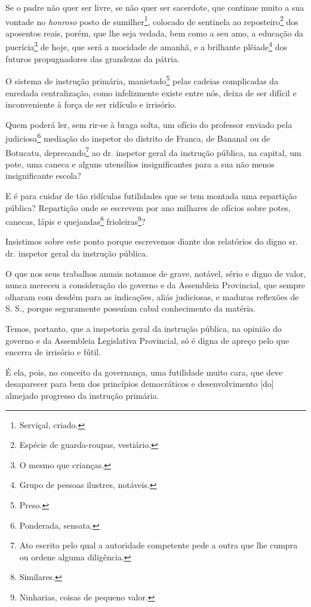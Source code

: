 Se o padre não quer ser livre, se não quer ser sacerdote, que continue
muito a sua vontade no \emph{honroso} posto de sumilher\footnote{
  Serviçal, criado.}, colocado de sentinela ao reposteiro\footnote{
  Espécie de guarda-roupas, vestiário.} dos aposentos reais, porém, que
lhe seja vedada, bem como a seu amo, a educação da puerícia\footnote{O
  mesmo que crianças.} de hoje, que será a mocidade de amanhã, e a
brilhante plêiade\footnote{Grupo de pessoas ilustres, notáveis.} dos
futuros propugnadores das grandezas da pátria.

O sistema de instrução primária, manietado\footnote{Preso.} pelas
cadeias complicadas da enredada centralização, como infelizmente existe
entre nós, deixa de ser difícil e inconveniente à força de ser ridículo
e irrisório.

Quem poderá ler, sem rir-se à braga solta, um ofício do professor
enviado pela judiciosa\footnote{Ponderada, sensata.} mediação do
inspetor do distrito de Franca, de Bananal ou de Botucatu,
deprecando\footnote{Ato escrito pelo qual a autoridade competente pede
  a outra que lhe cumpra ou ordene alguma diligência.} ao dr. inspetor
geral da instrução pública, na capital, um pote, uma caneca e alguns
utensílios insignificantes para a sua não menos insignificante escola?

E é para cuidar de tão ridículas futilidades que se tem montada uma
repartição pública? Repartição onde se escrevem por ano milhares de
ofícios sobre potes, canecas, lápis e quejandas\footnote{Similares.}
frioleiras\footnote{Ninharias, coisas de pequeno valor.}?

Insistimos sobre este ponto porque escrevemos diante dos relatórios do
digno sr. dr. inspetor geral da instrução pública.

O que nos seus trabalhos anuais notamos de grave, notável, sério e digno
de valor, nunca mereceu a consideração do governo e da Assembleia
Provincial, que sempre olharam com desdém para as indicações, aliás
judiciosas, e maduras reflexões de S. S., porque seguramente possuíam
cabal conhecimento da matéria.

Temos, portanto, que a inspetoria geral da instrução pública, na opinião
do governo e da Assembleia Legislativa Provincial, só é digna de apreço
pelo que encerra de irrisório e fútil.

É ela, pois, no conceito da governança, uma futilidade muito cara, que
deve desaparecer para bem dos princípios democráticos e desenvolvimento
{[}do{]} almejado progresso da instrução primária.

